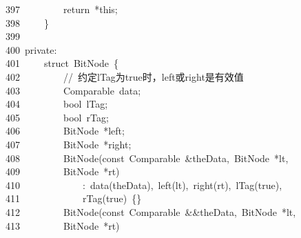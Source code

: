 \documentclass[11pt,a4paper]{ctexart}
\newcommand{\hlstd}[1]{\textcolor[rgb]{0.2,0.2,0.2}{#1}}
\newcommand{\hlslc}[1]{\textcolor[rgb]{0.59,0.59,0.59}{#1}}
\newcommand{\hlopt}[1]{\textcolor[rgb]{0.2,0.2,0.2}{#1}}
\newcommand{\hllin}[1]{\textcolor[rgb]{0.59,0.59,0.59}{#1}}
\newcommand{\hlkwa}[1]{\textcolor[rgb]{0.23,0.42,0.78}{#1}}
\newcommand{\hlkwb}[1]{\textcolor[rgb]{0.63,0,0.31}{#1}}
\newcommand{\hlkwc}[1]{\textcolor[rgb]{0,0.63,0.31}{#1}}
\newcommand{\hlkwd}[1]{\textcolor[rgb]{0.78,0.23,0.41}{#1}}
\begin{document}
\hllin{397\ }\hlstd{}\hlstd{\ \ \ \ \ \ \ \ }\hlstd{}\hlkwa{return\ }\hlstd{}\hlopt{{*}}\hlstd{}\hlkwa{this}\hlstd{}\hlopt{;}\\
\hllin{398\ }\hlstd{}\hlstd{\ \ \ \ }\hlstd{}\hlopt{\}}\\
\hllin{399\ }\hlstd{}\\
\hllin{400\ }\hlstd{}\hlkwc{private}\hlstd{}\hlopt{:}\\
\hllin{401\ }\hlstd{}\hlstd{\ \ \ \ }\hlstd{}\hlkwb{struct\ }\hlstd{BitNode\ }\hlopt{\{}\\
\hllin{402\ }\hlstd{}\hlstd{\ \ \ \ \ \ \ \ }\hlstd{}\hlslc{//\ 约定lTag为true时，left或right是有效值}\\
\hllin{403\ }\hlstd{}\hlstd{\ \ \ \ \ \ \ \ }\hlstd{Comparable\ data}\hlopt{;}\\
\hllin{404\ }\hlstd{}\hlstd{\ \ \ \ \ \ \ \ }\hlstd{}\hlkwb{bool\ }\hlstd{lTag}\hlopt{;}\\
\hllin{405\ }\hlstd{}\hlstd{\ \ \ \ \ \ \ \ }\hlstd{}\hlkwb{bool\ }\hlstd{rTag}\hlopt{;}\\
\hllin{406\ }\hlstd{}\hlstd{\ \ \ \ \ \ \ \ }\hlstd{BitNode\ }\hlopt{{*}}\hlstd{left}\hlopt{;}\\
\hllin{407\ }\hlstd{}\hlstd{\ \ \ \ \ \ \ \ }\hlstd{BitNode\ }\hlopt{{*}}\hlstd{right}\hlopt{;}\\
\hllin{408\ }\hlstd{}\hlstd{\ \ \ \ \ \ \ \ }\hlstd{}\hlkwd{BitNode}\hlstd{}\hlopt{(}\hlstd{}\hlkwb{const\ }\hlstd{Comparable\ }\hlopt{\&}\hlstd{theData}\hlopt{,\ }\hlstd{BitNode\ }\hlopt{{*}}\hlstd{lt}\hlopt{,\ }\Righttorque\\
\hllin{409\ }\hlstd{}\hlstd{\ \ \ \ \ \ \ \ }\hlstd{BitNode\ }\hlopt{{*}}\hlstd{rt}\hlopt{)}\\
\hllin{410\ }\hlstd{}\hlstd{\ \ \ \ \ \ \ \ \ \ \ \ }\hlstd{}\hlopt{:\ }\hlstd{}\hlkwd{data}\hlstd{}\hlopt{(}\hlstd{theData}\hlopt{),\ }\hlstd{}\hlkwd{left}\hlstd{}\hlopt{(}\hlstd{lt}\hlopt{),\ }\hlstd{}\hlkwd{right}\hlstd{}\hlopt{(}\hlstd{rt}\hlopt{),\ }\hlstd{}\hlkwd{lTag}\hlstd{}\hlopt{(}\hlstd{}\hlkwa{true}\hlstd{}\hlopt{),}\Righttorque\\
\hllin{411\ }\hlstd{}\hlstd{\ \ \ \ \ \ \ \ \ \ \ \ }\hlstd{}\hlkwd{rTag}\hlstd{}\hlopt{(}\hlstd{}\hlkwa{true}\hlstd{}\hlopt{)\ \{\}}\\
\hllin{412\ }\hlstd{}\hlstd{\ \ \ \ \ \ \ \ }\hlstd{}\hlkwd{BitNode}\hlstd{}\hlopt{(}\hlstd{}\hlkwb{const\ }\hlstd{Comparable\ }\hlopt{\&\&}\hlstd{theData}\hlopt{,\ }\hlstd{BitNode\ }\hlopt{{*}}\hlstd{lt}\hlopt{,\ }\Righttorque\\
\hllin{413\ }\hlstd{}\hlstd{\ \ \ \ \ \ \ \ }\hlstd{BitNode\ }\hlopt{{*}}\hlstd{rt}\hlopt{)}\\
\end{document}
